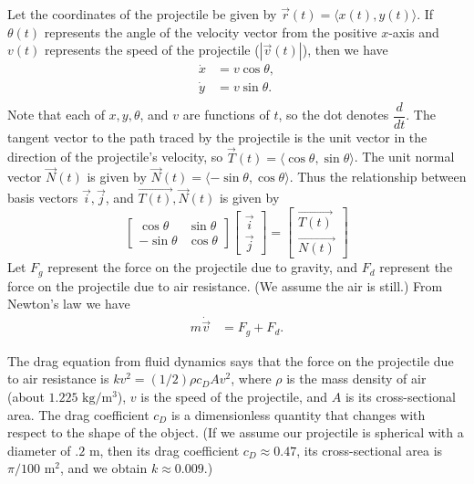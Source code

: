 Let the coordinates of the projectile be given by $\vec{r}(t) = \langle x(t), y(t) \rangle$.
If $\theta(t)$ represents the angle of the velocity vector from the positive $x$-axis and $v(t)$ represents the speed of the projectile ($ |\vec{v}(t) |$), then we have
\begin{align*}
\dot{x} &= v\cos{\theta},\\
\dot{y} &= v\sin{\theta}.\\
\end{align*} Note that each of $x,y,\theta$, and $v$ are functions of $t$, so the dot %
denotes $\dfrac{d}{dt}$.
The tangent vector to the path traced by the projectile is the unit vector in the direction of the projectile's velocity, so $\vec{T}(t) = \langle \cos{\theta}, \sin{\theta} \rangle$.
The unit normal vector $\vec{N} (t)$ is given by $\vec{N} (t)= \langle -\sin{\theta}, \cos{\theta} \rangle$.
Thus the relationship between basis vectors $\vec{i}, \vec{j}$, and $\vec{T(t)}, \vec{N}(t)$ is given by
\[\left[\begin{array}{cc}\cos{\theta} & \sin{\theta} \\-\sin{\theta} & \cos{\theta}\end{array}\right] \left[\begin{array}{c}\vec{i} \\\vec{j}\end{array}\right] = \left[\begin{array}{c}\vec{T(t)} \\\vec{N(t)}\end{array}\right]\]
Let $F_g$ represent the force on the projectile due to gravity, and $F_d$ represent the force on the projectile due to air resistance. (We assume the air is still.)
From Newton's law we have
\begin{align*}
m \dot{\vec{v}} &= F_g + F_d.
\end{align*}

The drag equation from fluid dynamics says that the force on the projectile due to air resistance is $k v^2 = (1/2)\rho c_D A v^2$, where $\rho$ is the mass density of air (about $1.225$ $\text{kg}/\text{m}^3$), $v$ is the speed of the projectile, and $A$ is its cross-sectional area.
The drag coefficient $c_D$ is a dimensionless quantity that changes with respect to the shape of the object.
(If we assume our projectile is spherical with a diameter of $.2$ m, then its drag coefficient $c_D \approx 0.47$, its cross-sectional area is $\pi/100$ $ \text{m}^2$, and we obtain $k \approx 0.009$.)

